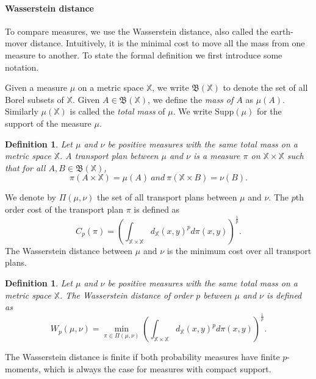 \documentclass[a4paper]{article}
\newcommand\X{\mathbb{X}}
\newcommand\dX[2]{d_\X(#1,#2)}
\newcommand\Supp[1]{\mathrm{Supp}(#1)}
\newtheorem{definition}[theorem]{Definition}
\begin{document}
\paragraph{Wasserstein distance\\}
To compare measures, we use the Wasserstein distance, also called the earth-mover distance.
Intuitively, it is the minimal cost to move all the mass from one measure to another.
To state the formal definition we first introduce some notation.

Given a measure $\mu$ on a metric space $\X$, we write $\mathfrak{B}(\X)$ to denote the set of all Borel subsets of $\X$.
Given $A\in\mathfrak{B}(\X)$, we define the \emph{mass of $A$} as $\mu(A)$.
Similarly $\mu(\X)$ is called the \emph{total mass} of $\mu$.
We write $\Supp{\mu}$ for the support of the measure $\mu$.


\begin{definition}
Let $\mu$ and $\nu$ be positive measures with the same total mass on a metric space $\X$.
A \emph{transport plan} between $\mu$ and $\nu$ is a measure $\pi$ on $\X\times\X$ such that for all $A,B\in\mathfrak{B}(\X)$,
\[
  \pi(A\times\X)=\mu(A)\ and\ \pi(\X\times B)=\nu(B).
\]
\end{definition}

We denote by $\Pi(\mu,\nu)$ the set of all transport plans between $\mu$ and $\nu$.
The $p$th order cost of the transport plan $\pi$ is defined as
\[
  C_p(\pi)=\left(\int_{\X\times\X}\dX{x}{y}^p d\pi(x,y)\right)^{\frac{1}{p}}.
\]
The Wasserstein distance between $\mu$ and $\nu$ is the minimum cost over all transport plans.

\begin{definition}
Let $\mu$ and $\nu$ be positive measures with the same total mass on a metric space $\X$. 
The \emph{Wasserstein distance} of order $p$ between $\mu$ and $\nu$ is defined as
$$W_p(\mu,\nu)=\min_{\pi\in\Pi(\mu,\nu)}\left(\int_{\X\times\X}\dX{x}{y}^p d\pi(x,y)\right)^{\frac{1}{p}}.$$
\end{definition}

The Wasserstein distance is finite if both probability measures have finite $p$-moments, which is always the case for measures with compact support.
\end{document}
